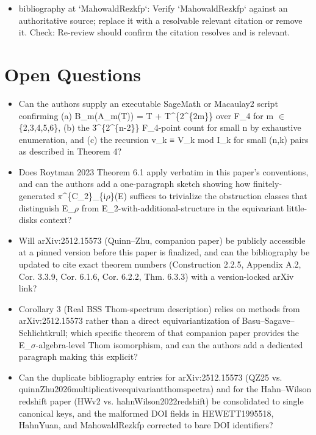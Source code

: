 \documentclass[11pt]{article}
\begin{document}
\begin{itemize}[leftmargin=*]
  \item [open] bibliography at `MahowaldRezkfp`: Verify `MahowaldRezkfp` against an authoritative source; replace it with a resolvable relevant citation or remove it. Check: Re-review should confirm the citation resolves and is relevant.
\end{itemize}

\section*{Open Questions}
\begin{itemize}[leftmargin=*]
  \item Can the authors supply an executable SageMath or Macaulay2 script confirming (a) B\_m(A\_m(T)) = T + T\^{}\{2\^{}\{2m\}\} over F\_4 for m \ensuremath{\in} \{2,3,4,5,6\}, (b) the 3\^{}\{2\^{}\{n-2\}\} F\_4-point count for small n by exhaustive enumeration, and (c) the recursion v\_k ≡ V\_k mod I\_k for small (n,k) pairs as described in Theorem 4?
  \item Does Roytman 2023 Theorem 6.1 apply verbatim in this paper's conventions, and can the authors add a one-paragraph sketch showing how finitely-generated \ensuremath{\pi}\^{}\{C\_2\}\_\{i\ensuremath{\rho}\}(E) suffices to trivialize the obstruction classes that distinguish E\_\ensuremath{\rho} from E\_2-with-additional-structure in the equivariant little-disks context?
  \item Will arXiv:2512.15573 (Quinn--Zhu, companion paper) be publicly accessible at a pinned version before this paper is finalized, and can the bibliography be updated to cite exact theorem numbers (Construction 2.2.5, Appendix A.2, Cor. 3.3.9, Cor. 6.1.6, Cor. 6.2.2, Thm. 6.3.3) with a version-locked arXiv link?
  \item Corollary 3 (Real BSS Thom-spectrum description) relies on methods from arXiv:2512.15573 rather than a direct equivariantization of Basu--Sagave--Schlichtkrull; which specific theorem of that companion paper provides the E\_\ensuremath{\sigma}-algebra-level Thom isomorphism, and can the authors add a dedicated paragraph making this explicit?
  \item Can the duplicate bibliography entries for arXiv:2512.15573 (QZ25 vs. quinnZhu2026multiplicativeequivariantthomspectra) and for the Hahn--Wilson redshift paper (HWv2 vs. hahnWilson2022redshift) be consolidated to single canonical keys, and the malformed DOI fields in HEWETT1995518, HahnYuan, and MahowaldRezkfp corrected to bare DOI identifiers?
\end{itemize}
\end{document}
